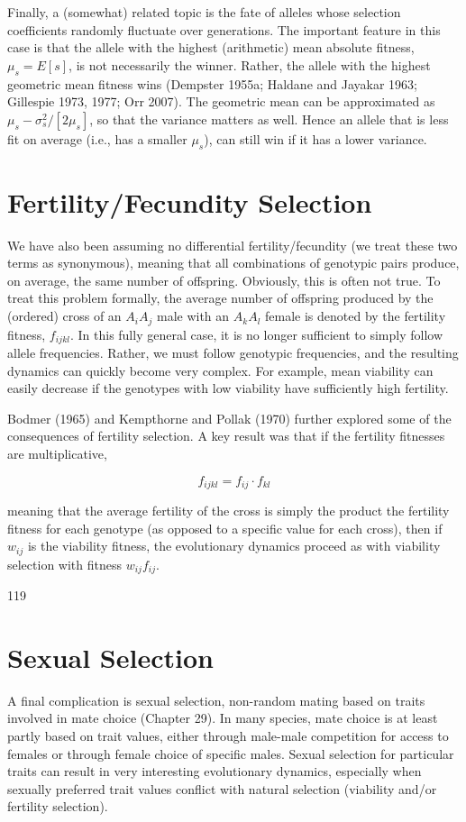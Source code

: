 \documentclass{article}
\begin{document}
Finally, a (somewhat) related topic is the fate of alleles whose selection coefficients randomly fluctuate over generations. The important feature in this case is that the allele with the highest (arithmetic) mean absolute fitness,  $ \mu_s = E[s] $, is not necessarily the winner. Rather, the allele with the highest geometric mean fitness wins (Dempster 1955a; Haldane and Jayakar 1963; Gillespie 1973, 1977; Orr 2007). The geometric mean can be approximated as  $ \mu_s - \sigma_s^2 / [2\mu_s] $, so that the variance matters as well. Hence an allele that is less fit on average (i.e., has a smaller  $ \mu_s $), can still win if it has a lower variance.

\section{Fertility/Fecundity Selection}
We have also been assuming no differential fertility/fecundity (we treat these two terms as synonymous), meaning that all combinations of genotypic pairs produce, on average, the same number of offspring. Obviously, this is often not true. To treat this problem formally, the average number of offspring produced by the (ordered) cross of an  $ A_i A_j $ male with an  $ A_k A_l $ female is denoted by the fertility fitness,  $ f_{ijkl} $. In this fully general case, it is no longer sufficient to simply follow allele frequencies. Rather, we must follow genotypic frequencies, and the resulting dynamics can quickly become very complex. For example, mean viability can easily decrease if the genotypes with low viability have sufficiently high fertility.

Bodmer (1965) and Kempthorne and Pollak (1970) further explored some of the consequences of fertility selection. A key result was that if the fertility fitnesses are multiplicative,

\begin{equation}
f_{i j k l}=f_{i j}\cdot f_{k l}
\end{equation}

meaning that the average fertility of the cross is simply the product the fertility fitness for each genotype (as opposed to a specific value for each cross), then if  $ w_{ij} $ is the viability fitness, the evolutionary dynamics proceed as with viability selection with fitness  $ w_{ij}f_{ij} $.

119

\section{Sexual Selection}
A final complication is sexual selection, non-random mating based on traits involved in mate choice (Chapter 29). In many species, mate choice is at least partly based on trait values, either through male-male competition for access to females or through female choice of specific males. Sexual selection for particular traits can result in very interesting evolutionary dynamics, especially when sexually preferred trait values conflict with natural selection (viability and/or fertility selection).
\end{document}
